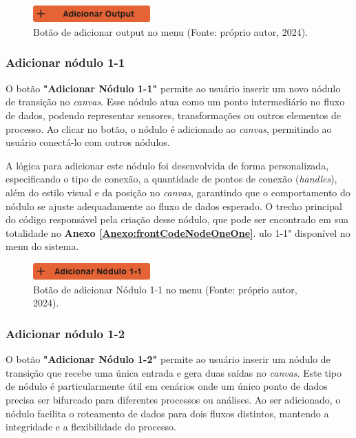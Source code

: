 \begin{figure}[htbp]
    \centering
    \includegraphics[width=0.4\textwidth]{figuras/add-output-button.png}
    \caption{Botão de adicionar output no menu (Fonte: próprio autor, 2024).}
    \label{Fig:AddOutputButton}
\end{figure}

\subsubsection{Adicionar nódulo 1-1}

O botão \textbf{"Adicionar Nódulo 1-1"} permite ao usuário inserir um novo nódulo de transição no \textit{canvas}. Esse nódulo atua como um ponto intermediário no fluxo de dados, podendo representar sensores, transformações ou outros elementos de processo. Ao clicar no botão, o nódulo é adicionado ao \textit{canvas}, permitindo ao usuário conectá-lo com outros nódulos.

A lógica para adicionar este nódulo foi desenvolvida de forma personalizada, especificando o tipo de conexão, a quantidade de pontos de conexão (\textit{handles}), além do estilo visual e da posição no \textit{canvas}, garantindo que o comportamento do nódulo se ajuste adequadamente ao fluxo de dados esperado. O trecho principal do código responsável pela criação desse nódulo, que pode ser encontrado em sua totalidade no \textbf{Anexo \ref{Anexo:frontCodeNodeOneOne}}.
ulo 1-1" disponível no menu do sistema.

\begin{figure}[htbp]
    \centering
    \includegraphics[width=0.4\textwidth]{figuras/add-node11-button.png}
    \caption{Botão de adicionar Nódulo 1-1 no menu (Fonte: próprio autor, 2024).}
    \label{Fig:AddNodeOneOneButton}
\end{figure}

\subsubsection{Adicionar nódulo 1-2}

O botão \textbf{"Adicionar Nódulo 1-2"} permite ao usuário inserir um nódulo de transição que recebe uma única entrada e gera duas saídas no \textit{canvas}. Este tipo de nódulo é particularmente útil em cenários onde um único ponto de dados precisa ser bifurcado para diferentes processos ou análises. Ao ser adicionado, o nódulo facilita o roteamento de dados para dois fluxos distintos, mantendo a integridade e a flexibilidade do processo.

